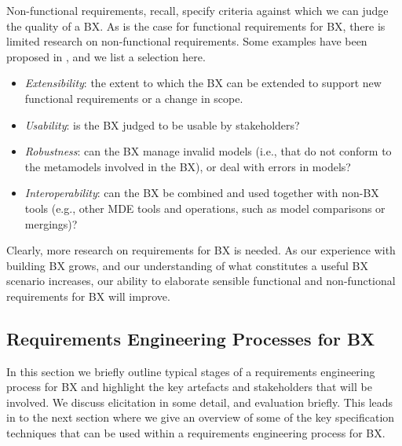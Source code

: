 Non-functional requirements, recall, specify criteria against which we can judge the quality of a BX. As is the case for functional requirements for BX, there is limited research on non-functional requirements. Some examples have been proposed in \cite{NalchigarSC13}, and we list a selection here.

\begin{itemize}
\item \textit{Extensibility}: the extent to which the BX can be extended to support new functional requirements  or a change in scope.

\item \textit{Usability}: is the BX judged to be usable by stakeholders?

\item \textit{Robustness}: can the BX manage invalid models (i.e., that do not conform to the metamodels involved in the BX), or deal with errors in models?

\item \textit{Interoperability}: can the BX be combined and used together with non-BX tools (e.g., other MDE tools and operations, such as model comparisons or mergings)?
\end{itemize}

Clearly, more research on requirements for BX is needed. As our experience with building BX grows, and our understanding of what constitutes a useful BX scenario increases, our ability to elaborate sensible functional and non-functional requirements for BX will improve.

\subsection{Requirements Engineering Processes for BX}
In this section we briefly outline typical stages of a requirements engineering process for BX and highlight the key artefacts and stakeholders that will be involved. We discuss elicitation in some detail, and evaluation briefly. This leads in to the next section where we give an overview of some of the key specification techniques that can be used within a requirements engineering process for BX.

